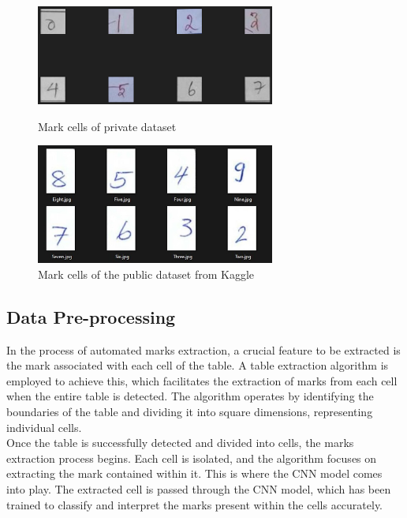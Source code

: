 \begin{figure}[h!]
    \centering
{\includegraphics[width=0.7\textwidth]{Images/Block_Diag/Clg_ans_sheet.png}}
  \vspace{-15pt}
  \caption{Mark cells of private dataset}
\end{figure} 

\begin{figure}[htbp]
  \centering
  \includegraphics[width=0.7\textwidth]{Images/Block_Diag/Kaggle_Dataset_Header.png}
  \vspace{-15pt}
  \caption{Mark cells of the public dataset from Kaggle}
\end{figure}

\clearpage

\subsection{Data Pre-processing}

In the process of automated marks extraction, a crucial feature to be extracted is the mark associated with each cell of the table. A table extraction algorithm is employed to achieve this, which facilitates the extraction of marks from each cell when the entire table is detected. The algorithm operates by identifying the boundaries of the table and dividing it into square dimensions, representing individual cells.\\

\noindent Once the table is successfully detected and divided into cells, the marks extraction process begins. Each cell is isolated, and the algorithm focuses on extracting the mark contained within it. This is where the CNN model comes into play. The extracted cell is passed through the CNN model, which has been trained to classify and interpret the marks present within the cells accurately.\\  

